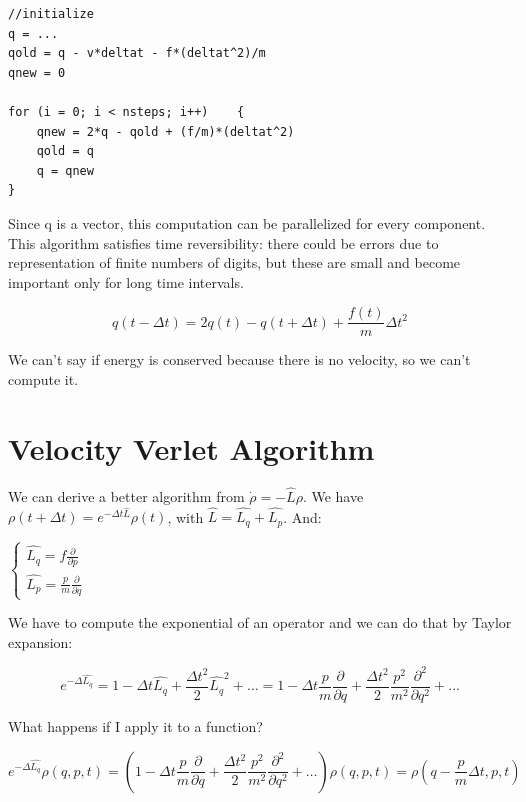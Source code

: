 \documentclass[a4paper, italian, openany]{book}
\begin{document}
\begin{lstlisting}
//initialize
q = ... 
qold = q - v*deltat - f*(deltat^2)/m
qnew = 0

for (i = 0; i < nsteps; i++)	{
	qnew = 2*q - qold + (f/m)*(deltat^2)
	qold = q
	q = qnew
}
\end{lstlisting}

Since q is a vector, this computation can be parallelized for every component.\newline
This algorithm satisfies time reversibility: there could be errors due to representation of finite numbers of digits, but these are small and become important only for long time intervals.

$$q(t-\Delta t) = 2q(t) -q(t +\Delta t) + \frac{f(t)}{m}\Delta t^2$$

We can't say if energy is conserved because there is no velocity, so we can't compute it.

\section{Velocity Verlet Algorithm}

We can derive a better algorithm from $\dot{\rho} = -\hat{L} \rho$.\newline
We have $\rho(t+\Delta t) = e^{-\Delta t \hat{L}} \rho(t)$, with $\hat{L}=\hat{L_q} + \hat{L_p}$. And:

$\begin{cases}
\hat{L_q} = f\frac{\partial}{\partial p} \\
\hat{L_p} = \frac{p}{m}\frac{\partial}{\partial q}
\end{cases}$

We have to compute the exponential of an operator and we can do that by Taylor expansion:

$$e^{-\Delta \hat{L_q}} = 1 - \Delta t \hat{L_q} + \frac{\Delta t^2}{2}\hat{L_q}^2 + \ldots = 1 - \Delta t \frac{p}{m} \frac{\partial}{\partial q} + \frac{\Delta t^2}{2}\frac{p^2}{m^2}\frac{\partial^2}{\partial q^2} + \ldots$$

What happens if I apply it to a function?

$$e^{-\Delta \hat{L_q}} \rho(q, p, t) = (1 - \Delta t \frac{p}{m} \frac{\partial}{\partial q} + \frac{\Delta t^2}{2}\frac{p^2}{m^2}\frac{\partial^2}{\partial q^2} + \ldots)\rho(q, p, t) = \rho(q-\frac{p}{m}\Delta t, p, t)$$
\end{document}
